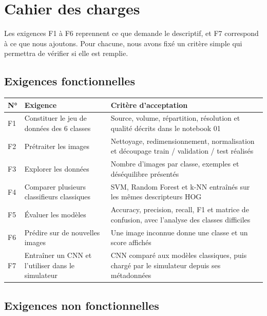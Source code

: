 \section{Cahier des charges}
\label{sec:cdc}

Les exigences F1 à F6 reprennent ce que demande le descriptif, et F7 correspond à ce que nous ajoutons. Pour chacune, nous avons fixé un critère simple qui permettra de vérifier si elle est remplie.

\subsection*{Exigences fonctionnelles}

\begin{center}
\begin{tabularx}{\textwidth}{l>{\raggedright\arraybackslash}p{5.6cm}Y}
  \toprule
  \textbf{N°} & \textbf{Exigence} & \textbf{Critère d'acceptation} \\
  \midrule
  F1 & Constituer le jeu de données des 6 classes & Source, volume, répartition, résolution et qualité décrits dans le notebook 01 \\
  F2 & Prétraiter les images & Nettoyage, redimensionnement, normalisation et découpage train / validation / test réalisés \\
  F3 & Explorer les données & Nombre d'images par classe, exemples et déséquilibre présentés \\
  F4 & Comparer plusieurs classifieurs classiques & SVM, Random Forest et k-NN entraînés sur les mêmes descripteurs HOG \\
  F5 & Évaluer les modèles & Accuracy, precision, recall, F1 et matrice de confusion, avec l'analyse des classes difficiles \\
  F6 & Prédire sur de nouvelles images & Une image inconnue donne une classe et un score affichés \\
  F7 & Entraîner un CNN et l'utiliser dans le simulateur & CNN comparé aux modèles classiques, puis chargé par le simulateur depuis ses métadonnées \\
  \bottomrule
\end{tabularx}
\end{center}

\subsection*{Exigences non fonctionnelles}

